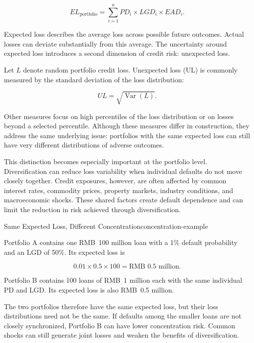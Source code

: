\begin{equation}
EL_{\mathrm{portfolio}}
=\sum_{i=1}^{n}
PD_i\times LGD_i\times EAD_i.
\label{eq:ch19-portfolio-el}
\end{equation}

Expected loss describes the average loss across possible future outcomes. Actual losses can deviate substantially from this average. The uncertainty around expected loss introduces a second dimension of credit risk: unexpected loss. 

Let \(L\) denote random portfolio credit loss. Unexpected loss (UL) is commonly measured by the standard deviation of the loss distribution:

\begin{equation}
UL=\sqrt{\operatorname{Var}(L)}.
\label{eq:ch19-unexpected-loss}
\end{equation}

Other measures focus on high percentiles of the loss distribution or on losses beyond a selected percentile. Although these measures differ in construction, they address the same underlying issue: portfolios with the same expected loss can still have very different distributions of adverse outcomes.

This distinction becomes especially important at the portfolio level. Diversification can reduce loss variability when individual defaults do not move closely together. Credit exposures, however, are often affected by common interest rates, commodity prices, property markets, industry conditions, and macroeconomic shocks. These shared factors create default dependence and can limit the reduction in risk achieved through diversification.

\begin{example}{Same Expected Loss, Different Concentration}{concentration-example}

Portfolio A contains one RMB~100 million loan with a 1\% default probability and an LGD of 50\%. Its expected loss is

$$
0.01\times 0.5\times 100
=
\text{RMB~} 0.5\text{ million}.
$$

Portfolio B contains 100 loans of RMB~1 million each with the same individual PD and LGD. Its expected loss is also RMB~0.5 million.

The two portfolios therefore have the same expected loss, but their loss distributions need not be the same. If defaults among the smaller loans are not closely synchronized, Portfolio B can have lower concentration risk. Common shocks can still generate joint losses and weaken the benefits of diversification.

\end{example}

